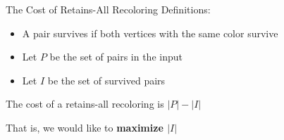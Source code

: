 \begin{frame}{The Cost of Retains-All Recoloring}
Definitions:
\begin{itemize}

\pause\item
A pair \alert{survives} if both vertices with the same color survive

\pause\item
Let $P$ be the set of pairs in the input  

\pause\item
Let $I$ be the set of survived pairs
 
\end{itemize}

\pause\begin{lemma}
The cost of a retains-all recoloring is $|P| - |I|$
\end{lemma}

\pause
That is, we would like to \textbf{maximize $|I|$}

\end{frame}